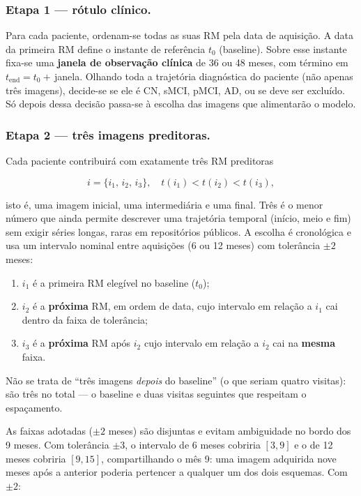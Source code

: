 \documentclass[review]{elsarticle}
\begin{document}
	\subsubsection{Etapa 1 --- rótulo clínico.}
		Para cada paciente, ordenam-se todas as suas RM pela data de aquisição.
		A data da primeira RM define o instante de referência $t_0$ (baseline).
		Sobre esse instante fixa-se uma \textbf{janela de observação clínica} de 36 ou 48 meses, com término em $t_{\mathrm{end}} = t_0 +$\,janela.
		Olhando toda a trajetória diagnóstica do paciente (não apenas três imagens), decide-se se ele é CN, sMCI, pMCI, AD, ou se deve ser excluído.
		Só depois dessa decisão passa-se à escolha das imagens que alimentarão o modelo.
	
	\subsubsection{Etapa 2 --- três imagens preditoras.}
	Cada paciente contribuirá com exatamente três RM preditoras
	
	\begin{equation}
		i=\{i_1,\,i_2,\,i_3\},
		\quad t(i_1)<t(i_2)<t(i_3),
	\end{equation}
	
	isto é, uma imagem inicial, uma intermediária e uma final.
	Três é o menor número que ainda permite descrever uma trajetória temporal (início, meio e fim) sem exigir séries longas, raras em repositórios públicos.
	A escolha é cronológica e usa um intervalo nominal entre aquisições (6 ou 12 meses) com tolerância $\pm 2$ meses:
	
	\begin{enumerate}
		\item $i_1$ é a primeira RM elegível no baseline ($t_0$);
		
		\item $i_2$ é a \textbf{próxima} RM, em ordem de data, cujo intervalo em relação a $i_1$ cai dentro da faixa de tolerância;
		
		\item $i_3$ é a \textbf{próxima} RM após $i_2$ cujo intervalo em relação a $i_2$ cai na \textbf{mesma} faixa.
	\end{enumerate}
	
	Não se trata de ``três imagens \emph{depois} do baseline'' (o que seriam quatro visitas): são três no total --- o baseline e duas visitas seguintes que respeitam o espaçamento.
	
	As faixas adotadas ($\pm 2$ meses) são disjuntas e evitam ambiguidade no bordo dos 9 meses.
	Com tolerância $\pm 3$, o intervalo de 6 meses cobriria $[3,9]$ e o de 12 meses cobriria $[9,15]$, compartilhando o mês 9: uma imagem adquirida nove meses após a anterior poderia pertencer a qualquer um dos dois esquemas.
	Com $\pm 2$:
	
\end{document}
